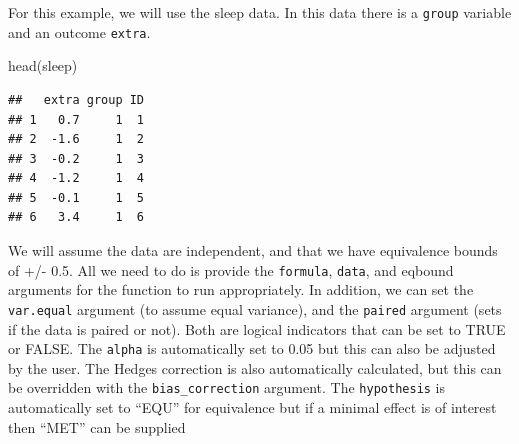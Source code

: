 \documentclass[]{interact}
\theoremstyle{plain}%
\theoremstyle{definition}
\theoremstyle{remark}
\newenvironment{Shaded}{\begin{snugshade}}{\end{snugshade}}
\newcommand{\AttributeTok}[1]{\textcolor[rgb]{0.77,0.63,0.00}{#1}}
\newcommand{\CommentTok}[1]{\textcolor[rgb]{0.56,0.35,0.01}{\textit{#1}}}
\newcommand{\DecValTok}[1]{\textcolor[rgb]{0.00,0.00,0.81}{#1}}
\newcommand{\FunctionTok}[1]{\textcolor[rgb]{0.00,0.00,0.00}{#1}}
\newcommand{\NormalTok}[1]{#1}
\newcommand{\OtherTok}[1]{\textcolor[rgb]{0.56,0.35,0.01}{#1}}
\newcommand{\SpecialCharTok}[1]{\textcolor[rgb]{0.00,0.00,0.00}{#1}}
\begin{document}
For this example, we will use the sleep data. In this data there is a
\texttt{group} variable and an outcome \texttt{extra}.

\begin{Shaded}
\begin{Highlighting}[]
\FunctionTok{head}\NormalTok{(sleep)}
\end{Highlighting}
\end{Shaded}

\begin{verbatim}
##   extra group ID
## 1   0.7     1  1
## 2  -1.6     1  2
## 3  -0.2     1  3
## 4  -1.2     1  4
## 5  -0.1     1  5
## 6   3.4     1  6
\end{verbatim}

We will assume the data are independent, and that we have equivalence
bounds of +/- 0.5. All we need to do is provide the \texttt{formula},
\texttt{data}, and eqbound arguments for the function to run
appropriately. In addition, we can set the \texttt{var.equal} argument
(to assume equal variance), and the \texttt{paired} argument (sets if
the data is paired or not). Both are logical indicators that can be set
to TRUE or FALSE. The \texttt{alpha} is automatically set to 0.05 but
this can also be adjusted by the user. The Hedges correction is also
automatically calculated, but this can be overridden with the
\texttt{bias\_correction} argument. The \texttt{hypothesis} is
automatically set to ``EQU'' for equivalence but if a minimal effect is
of interest then ``MET'' can be supplied

\begin{Shaded}
\end{Shaded}
\end{document}
